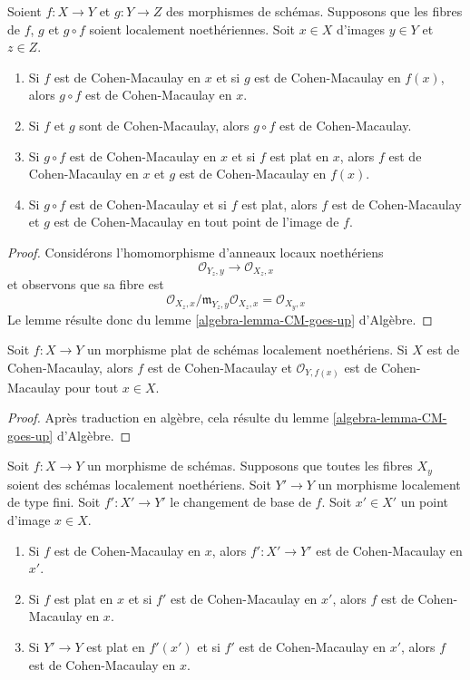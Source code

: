 \begin{lemma}
\label{lemma-composition-CM}
Soient $f : X \to Y$ et $g : Y \to Z$ des morphismes de schémas. Supposons que les
fibres de $f$, $g$ et $g \circ f$ soient localement noethériennes.
Soit $x \in X$ d'images $y \in Y$ et $z \in Z$.
\begin{enumerate}
\item Si $f$ est de Cohen-Macaulay en $x$ et si $g$ est de Cohen-Macaulay
en $f(x)$, alors $g \circ f$ est de Cohen-Macaulay en $x$.
\item Si $f$ et $g$ sont de Cohen-Macaulay, alors $g \circ f$ est de Cohen-Macaulay.
\item Si $g \circ f$ est de Cohen-Macaulay en $x$ et si $f$ est plat en $x$,
alors $f$ est de Cohen-Macaulay en $x$ et $g$ est de Cohen-Macaulay en $f(x)$.
\item Si $g \circ f$ est de Cohen-Macaulay et si $f$ est plat, alors
$f$ est de Cohen-Macaulay et $g$ est de Cohen-Macaulay en tout point
de l'image de $f$.
\end{enumerate}
\end{lemma}

\begin{proof}
Considérons l'homomorphisme d'anneaux locaux noethériens
$$
\mathcal{O}_{Y_z, y} \to \mathcal{O}_{X_z, x}
$$
et observons que sa fibre est
$$
\mathcal{O}_{X_z, x}/\mathfrak m_{Y_z, y}\mathcal{O}_{X_z, x} =
\mathcal{O}_{X_y, x}
$$
Le lemme résulte donc du
lemme \ref{algebra-lemma-CM-goes-up} d'Algèbre.
\end{proof}

\begin{lemma}
\label{lemma-flat-morphism-from-CM-scheme}
Soit $f : X \to Y$ un morphisme plat de schémas localement noethériens.
Si $X$ est de Cohen-Macaulay, alors $f$ est de Cohen-Macaulay et
$\mathcal{O}_{Y, f(x)}$ est de Cohen-Macaulay pour tout $x \in X$.
\end{lemma}

\begin{proof}
Après traduction en algèbre, cela résulte du
lemme \ref{algebra-lemma-CM-goes-up} d'Algèbre.
\end{proof}

\begin{lemma}
\label{lemma-base-change-CM}
Soit $f : X \to Y$ un morphisme de schémas.
Supposons que toutes les fibres $X_y$ soient des schémas localement noethériens.
Soit $Y' \to Y$ un morphisme localement de type fini. Soit $f' : X' \to Y'$
le changement de base de $f$.
Soit $x' \in X'$ un point d'image $x \in X$.
\begin{enumerate}
\item Si $f$ est de Cohen-Macaulay en $x$, alors
$f' : X' \to Y'$ est de Cohen-Macaulay en $x'$.
\item Si $f$ est plat en $x$ et si $f'$ est de Cohen-Macaulay en $x'$, alors $f$
est de Cohen-Macaulay en $x$.
\item Si $Y' \to Y$ est plat en $f'(x')$ et si $f'$ est de Cohen-Macaulay en
$x'$, alors $f$ est de Cohen-Macaulay en $x$.
\end{enumerate}
\end{lemma}

